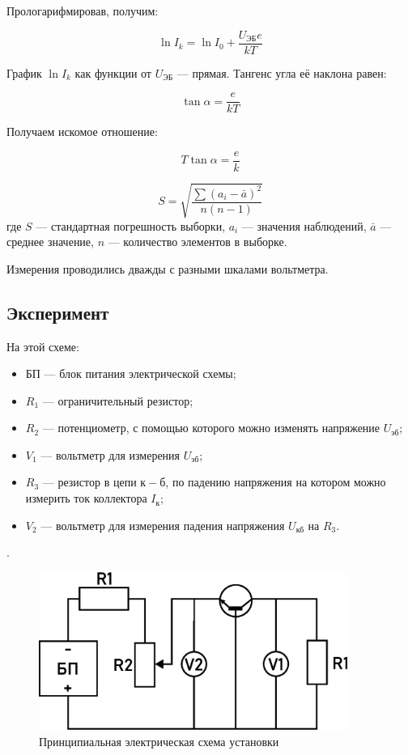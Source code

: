 Прологарифмировав, получим:

\begin{equation}
\ln I_k = \ln I_0 + \frac{U_{\text{ЭБ}} e}{kT}
\end{equation}

График \( \ln I_k \) как функции от \( U_{\text{ЭБ}} \) — прямая. Тангенс угла её наклона равен:

\begin{equation}
\tan \alpha = \frac{e}{kT}
\end{equation}

Получаем искомое отношение:

\begin{equation}
T \tan \alpha= \frac{e}{k}
\end{equation}

\begin{equation}
S = \sqrt{\frac{\sum (a_i - \bar{a})^2}{n(n-1)}}
\end{equation}
где \(S\) — стандартная погрешность выборки, \(a_i\) — значения наблюдений, \(\bar{a}\) — среднее значение, \(n\) — количество элементов в выборке.

Измерения проводились дважды с разными шкалами вольтметра.

\subsection{Эксперимент}
На этой схеме:
\begin{itemize}
    \item БП — блок питания электрической схемы;
    \item \( R_1 \) — ограничительный резистор;
    \item \( R_2 \) — потенциометр, с помощью которого можно изменять напряжение \( U_{\text{эб}} \);
    \item \( V_1 \) — вольтметр для измерения \( U_{\text{эб}} \);
    \item \( R_3 \) — резистор в цепи \( к-б \), по падению напряжения на котором можно измерить ток коллектора \( I_{\text{к}} \);
    \item \( V_2 \) — вольтметр для измерения падения напряжения \( U_{\text{кб}} \) на \( R_3 \).
\end{itemize}.

\begin{figure}[ht!]
\centering
\includegraphics[width=0.9\textwidth]{транзистор.eps}
\caption{Принципиальная электрическая схема установки}
\label{fig:sketch}
\end{figure}

